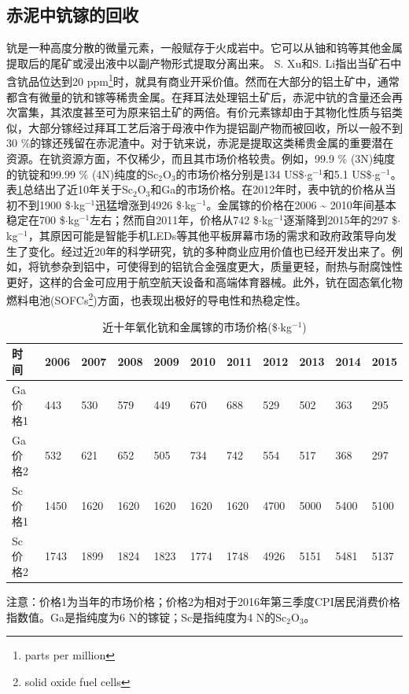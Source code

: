 \subsection{赤泥中钪镓的回收}
钪是一种高度分散的微量元素，一般赋存于火成岩中。它可以从铀和钨等其他金属提取后的尾矿或浸出液中以副产物形式提取分离出来\cite{roosen2016recovery}。
S. Xu和S. Li\cite{shaoquan1996review}指出当矿石中含钪品位达到20 ppm\footnote{parts per million}时，就具有商业开采价值。然而在大部分的铝土矿中，通常都含有微量的钪和镓等稀贵金属。在拜耳法处理铝土矿后，赤泥中钪的含量还会再次富集，其浓度甚至可为原来铝土矿的两倍\cite{ochsenkuhn1994direct}。有价元素镓却由于其物化性质与铝类似，大部分镓经过拜耳工艺后溶于母液中作为提铝副产物而被回收，所以一般不到30 \%的镓还残留在赤泥渣中\cite{liu2015metallurgical}。对于钪来说，赤泥是提取这类稀贵金属的重要潜在资源。在钪资源方面，不仅稀少，而且其市场价格较贵。例如，99.9 \% (3N)纯度的钪锭和99.99 \% (4N)纯度的Sc$ _{\mathrm{2}} $O$_{\mathrm{3}}$的市场价格分别是134 US\$$\cdot$g$ ^{\mathrm{-1}} $和5.1 US\$$\cdot$g$ ^{\mathrm{-1}} $\cite{ober2016mineral}。表\ref{priceofScandGa}总结出了近10年关于Sc$ _{\mathrm{2}} $O$_{\mathrm{3}}$和Ga的市场价格\cite{ober2016mineral,Brian2011mineral}。在2012年时，表中钪的价格从当初不到1900 \$$\cdot$kg$ ^{\mathrm{-1}} $迅猛增涨到4926 \$$\cdot$kg$ ^{\mathrm{-1}} $。金属镓的价格在2006 \textasciitilde{ }2010年间基本稳定在700 \$$\cdot$kg$ ^{\mathrm{-1}} $左右；然而自2011年，价格从742 \$$\cdot$kg$ ^{\mathrm{-1}} $逐渐降到2015年的297 \$$\cdot$kg$ ^{\mathrm{-1}} $，其原因可能是智能手机LEDs等其他平板屏幕市场的需求和政府政策导向发生了变化。经过近20年的科学研究，钪的多种商业应用价值也已经开发出来了。例如，将钪参杂到铝中，可使得到的铝钪合金强度更大，质量更轻，耐热与耐腐蚀性更好，这样的合金可应用于航空航天设备和高端体育器械。此外，钪在固态氧化物燃料电池(SOFCs\footnote{solid oxide fuel cells})方面，也表现出极好的导电性和热稳定性\cite{irvine2005scandia}。
\begin{table}[!htbp]
	\centering
	\wu
	\renewcommand\arraystretch{1.2}
	\begin{threeparttable}
		\vspace{-5pt}
		\caption[近十年氧化钪和金属镓的市场价格]{近十年氧化钪和金属镓的市场价格(\$$\cdot$kg$ ^{\mathrm{-1}} $)}\label{priceofScandGa}
		\begin{tabularx}{\linewidth}{p{1.7cm}XXXXXXXXXX}
			\toprule[1.5pt]
			时间&2006&2007&2008&2009&2010&2011&2012&2013&2014&2015\\\midrule
			Ga价格1&443&530&579&449&670&688&529&502&363&295\\
			Ga价格2&532&621&652&505&734&742&554&517&368&297\\
			Sc价格1&1450&1620&1620&1620&1620&1620&4700&5000&5400&5100\\
			Sc价格2&1743&1899&1824&1823&1774&1748&4926&5151&5481&5137\\
			\bottomrule[1.5pt]
		\end{tabularx}\vspace{4pt}
		{\footnotesize 注意：价格1为当年的市场价格；价格2为相对于2016年第三季度CPI居民消费价格指数值。Ga是指纯度为6 N的镓锭；Sc是指纯度为4 N的Sc$ _{\mathrm{2}} $O$ _{\mathrm{3}} $。}
	\end{threeparttable}
\end{table}


